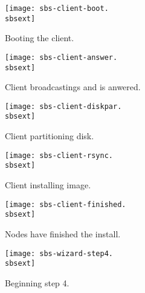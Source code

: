 \clearpage
\setlength{\oddsidemargin}{-0.5in}
\setlength{\evensidemargin}{-0.5in}
\setlength{\textwidth}{7.5in}

\begin{figure}[htbp]
  \begin{center}
    \texttt{[image: sbs-client-boot.\\sbsext]}
    \caption{Booting the client.}
    \label{fig:sbs-install-boot}
  \end{center}
\end{figure}

\begin{figure}[htbp]
  \begin{center}
    \texttt{[image: sbs-client-answer.\\sbsext]}
    \caption{Client broadcastings and is anwered.}
    \label{fig:sbs-install-broadcast}
  \end{center}
\end{figure}

\begin{figure}[htbp]
  \begin{center}
    \texttt{[image: sbs-client-diskpar.\\sbsext]}
    \caption{Client partitioning disk.}
    \label{fig:sbs-install-diskpar}
  \end{center}
\end{figure}

\begin{figure}[htbp]
  \begin{center}
    \texttt{[image: sbs-client-rsync.\\sbsext]}
    \caption{Client installing image.}
    \label{fig:sbs-install-rsync}
  \end{center}
\end{figure}

\begin{figure}[htbp]
  \begin{center}
    \texttt{[image: sbs-client-finished.\\sbsext]}
    \caption{Nodes have finished the install.}
    \label{fig:sbs-install-finish}
  \end{center}
\end{figure}

\begin{figure}[htbp]
  \begin{center}
    \texttt{[image: sbs-wizard-step4.\\sbsext]}
    \caption{Beginning step 4.}
    \label{fig:sbs-install-wizard-s4}
  \end{center}
\end{figure}

